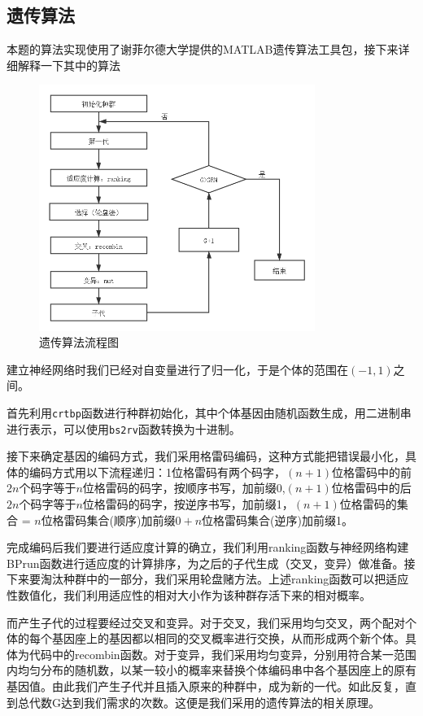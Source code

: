 \documentclass{article}
\begin{document}
	\subsection{遗传算法}
	本题的算法实现使用了谢菲尔德大学提供的MATLAB遗传算法工具包，接下来详细解释一下其中的算法
	\begin{figure}[!h]
		\centering 
		\includegraphics[width=0.8\textwidth]{遗传算法流程图.png}
		\caption{遗传算法流程图}
	\end{figure}
		
	建立神经网络时我们已经对自变量进行了归一化，于是个体的范围在$(-1,1)$之间。
	
	首先利用\verb|crtbp|函数进行种群初始化，其中个体基因由随机函数生成，用二进制串进行表示，可以使用\verb|bs2rv|函数转换为十进制。
	
	接下来确定基因的编码方式，我们采用格雷码编码，这种方式能把错误最小化，具体的编码方式用以下流程递归：1位格雷码有两个码字，$(n+1)$位格雷码中的前$2n$个码字等于$n$位格雷码的码字，按顺序书写，加前缀0,$(n+1)$位格雷码中的后$2n$个码字等于$n$位格雷码的码字，按逆序书写，加前缀1，$(n+1)$位格雷码的集合 = $n$位格雷码集合(顺序)加前缀$0+n$位格雷码集合(逆序)加前缀1。
	
	完成编码后我们要进行适应度计算的确立，我们利用ranking函数与神经网络构建BPrun函数进行适应度的计算排序，为之后的子代生成（交叉，变异）做准备。接下来要淘汰种群中的一部分，我们采用轮盘赌方法。上述ranking函数可以把适应性数值化，我们利用适应性的相对大小作为该种群存活下来的相对概率。
	
	而产生子代的过程要经过交叉和变异。对于交叉，我们采用均匀交叉，两个配对个体的每个基因座上的基因都以相同的交叉概率进行交换，从而形成两个新个体。具体为代码中的recombin函数。对于变异，我们采用均匀变异，分别用符合某一范围内均匀分布的随机数，以某一较小的概率来替换个体编码串中各个基因座上的原有基因值。由此我们产生子代并且插入原来的种群中，成为新的一代。如此反复，直到总代数G达到我们需求的次数。这便是我们采用的遗传算法的相关原理。
\end{document}
